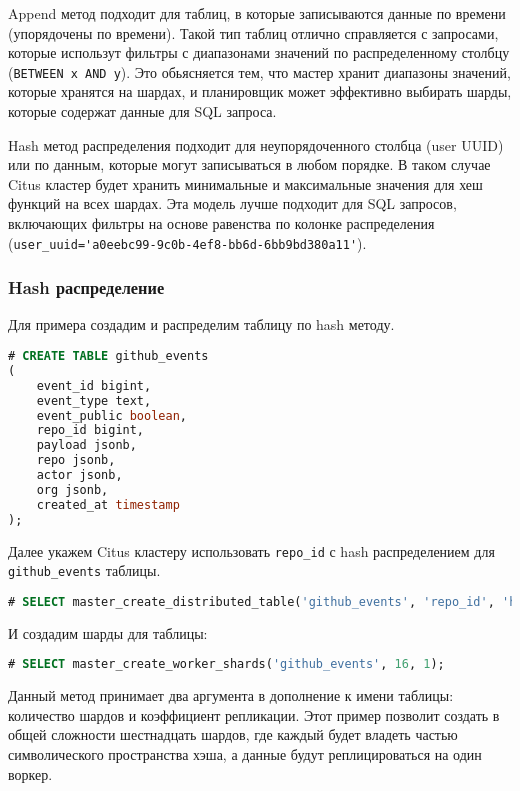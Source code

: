 Append метод подходит для таблиц, в которые записываются данные по времени (упорядочены по времени). Такой тип таблиц отлично справляется с запросами, которые использут фильтры с диапазонами значений по распределенному столбцу (\lstinline!BETWEEN x AND y!). Это обьясняется тем, что мастер хранит диапазоны значений, которые хранятся на шардах, и планировщик может эффективно выбирать шарды, которые содержат данные для SQL запроса.

Hash метод распределения подходит для неупорядоченного столбца (user UUID) или по данным, которые могут записываться в любом порядке. В таком случае Citus кластер будет хранить минимальные и максимальные значения для хеш функций на всех шардах. Эта модель лучше подходит для SQL запросов, включающих фильтры на основе равенства по колонке распределения (\lstinline!user_uuid='a0eebc99-9c0b-4ef8-bb6d-6bb9bd380a11'!).


\subsubsection{Hash распределение}

Для примера создадим и распределим таблицу по hash методу.

\begin{lstlisting}[language=SQL,label=lst:citus_hash1,caption=Создание таблицы]
# CREATE TABLE github_events
(
    event_id bigint,
    event_type text,
    event_public boolean,
    repo_id bigint,
    payload jsonb,
    repo jsonb,
    actor jsonb,
    org jsonb,
    created_at timestamp
);
\end{lstlisting}

Далее укажем Citus кластеру использовать \lstinline!repo_id! с hash распределением для \lstinline!github_events! таблицы.

\begin{lstlisting}[language=SQL,label=lst:citus_hash2,caption=Создание hash распределения]
# SELECT master_create_distributed_table('github_events', 'repo_id', 'hash');
\end{lstlisting}

И создадим шарды для таблицы:

\begin{lstlisting}[language=SQL,label=lst:citus_hash2,caption=Создание шардов]
# SELECT master_create_worker_shards('github_events', 16, 1);
\end{lstlisting}

Данный метод принимает два аргумента в дополнение к имени таблицы: количество шардов и коэффициент репликации. Этот пример позволит создать в общей сложности шестнадцать шардов, где каждый будет владеть частью символического пространства хэша, а данные будут реплицироваться на один воркер.

